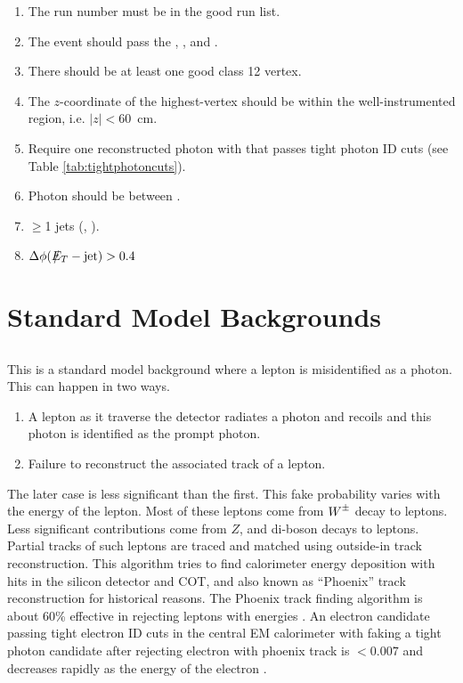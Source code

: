 \documentclass[11pt]{article}
\begin{document}
\begin{enumerate}
	\item The run number must be in the good run list.
	\item The event should pass the \firstphotrig, \secondphotrig, and \thirdphotrig.
	\item There should be at least one good class 12 vertex.
	\item The $z$-coordinate of the highest-\pt vertex should be within the well-instrumented region, i.e. \mbox{$|z|<60$~cm}.
	\item Require one reconstructed photon with  that passes tight photon ID cuts (see Table \ref{tab:tightphotoncuts}).
	\item Photon should be between \cosmictimewindow.
	\item $\geq$1 jets (, ).
	\item $\Delta \phi(\met - \mathrm{jet})>0.4$
\end{enumerate}

\section{Standard Model Backgrounds}\label{sec:SMbackgrounds}

\subsection{\elejets}\label{sec:elejets}
This is a standard model background where a lepton is misidentified as a photon. This can happen in two ways.

\begin{enumerate}
\item {A lepton as it traverse the detector radiates a photon and recoils and this photon is identified as the prompt photon.}
\item {Failure to reconstruct the associated track of a lepton.}
\end{enumerate}

The later case is less significant than the first. This fake probability varies with the energy of the lepton. Most of these leptons come from $\mbox{$W$}^{\pm}$ decay to leptons. Less significant contributions come from $Z$, and di-boson decays to leptons. Partial tracks of such leptons are traced and matched using outside-in track reconstruction. This algorithm tries to find calorimeter energy deposition with hits in the silicon detector and COT, and also known as ``Phoenix'' track reconstruction for historical reasons.  The Phoenix track finding algorithm is about 60\% effective in rejecting leptons with energies . An electron candidate passing tight electron ID cuts in the central EM calorimeter with  faking a tight photon candidate after rejecting electron with phoenix track is $<0.007$ and decreases rapidly as the energy of the electron \cite{CDF8220}.
\end{document}

